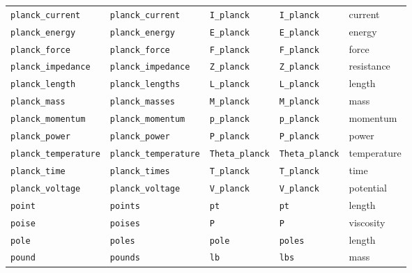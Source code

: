 \begin{landscape}
\begin{center}
\begin{longtable}{|lllll|}
{\tt\footnotesize planck\_current} & {\tt\footnotesize planck\_current} & {\tt\footnotesize I\_planck} & {\tt\footnotesize I\_planck} & current \\
{\tt\footnotesize planck\_energy} & {\tt\footnotesize planck\_energy} & {\tt\footnotesize E\_planck} & {\tt\footnotesize E\_planck} & energy \\
{\tt\footnotesize planck\_force} & {\tt\footnotesize planck\_force} & {\tt\footnotesize F\_planck} & {\tt\footnotesize F\_planck} & force \\
{\tt\footnotesize planck\_impedance} & {\tt\footnotesize planck\_impedance} & {\tt\footnotesize Z\_planck} & {\tt\footnotesize Z\_planck} & resistance \\
{\tt\footnotesize planck\_length} & {\tt\footnotesize planck\_lengths} & {\tt\footnotesize L\_planck} & {\tt\footnotesize L\_planck} & length \\
{\tt\footnotesize planck\_mass} & {\tt\footnotesize planck\_masses} & {\tt\footnotesize M\_planck} & {\tt\footnotesize M\_planck} & mass \\
{\tt\footnotesize planck\_momentum} & {\tt\footnotesize planck\_momentum} & {\tt\footnotesize p\_planck} & {\tt\footnotesize p\_planck} & momentum \\
{\tt\footnotesize planck\_power} & {\tt\footnotesize planck\_power} & {\tt\footnotesize P\_planck} & {\tt\footnotesize P\_planck} & power \\
{\tt\footnotesize planck\_temperature} & {\tt\footnotesize planck\_temperature} & {\tt\footnotesize Theta\_planck} & {\tt\footnotesize Theta\_planck} & temperature \\
{\tt\footnotesize planck\_time} & {\tt\footnotesize planck\_times} & {\tt\footnotesize T\_planck} & {\tt\footnotesize T\_planck} & time \\
{\tt\footnotesize planck\_voltage} & {\tt\footnotesize planck\_voltage} & {\tt\footnotesize V\_planck} & {\tt\footnotesize V\_planck} & potential \\
{\tt\footnotesize point} & {\tt\footnotesize points} & {\tt\footnotesize pt} & {\tt\footnotesize pt} & length \\
{\tt\footnotesize poise} & {\tt\footnotesize poises} & {\tt\footnotesize P} & {\tt\footnotesize P} & viscosity \\
{\tt\footnotesize pole} & {\tt\footnotesize poles} & {\tt\footnotesize pole} & {\tt\footnotesize poles} & length \\
{\tt\footnotesize pound} & {\tt\footnotesize pounds} & {\tt\footnotesize lb} & {\tt\footnotesize lbs} & mass \\

\end{longtable}
\end{center}
\end{landscape}
